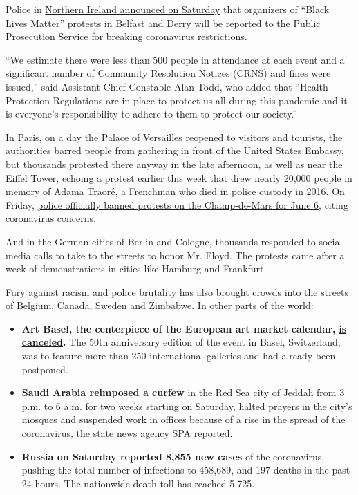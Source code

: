 Police in
\href{https://www.psni.police.uk/news/Latest-News/060620-planned-protests-in-belfast-and-derrylondonderry-have-ended/}{Northern
Ireland announced on Saturday} that organizers of ``Black Lives Matter''
protests in Belfast and Derry will be reported to the Public Prosecution
Service for breaking coronavirus restrictions.

``We estimate there were less than 500 people in attendance at each
event and a significant number of Community Resolution Notices (CRNS)
and fines were issued,'' said Assistant Chief Constable Alan Todd, who
added that ``Health Protection Regulations are in place to protect us
all during this pandemic and it is everyone's responsibility to adhere
to them to protect our society.''

In Paris,
\href{https://twitter.com/CVersailles/status/1269154953844703232}{on a
day the Palace of Versailles reopened} to visitors and tourists, the
authorities barred people from gathering in front of the United States
Embassy, but thousands protested there anyway in the late afternoon, as
well as near the Eiffel Tower, echoing a protest earlier this week that
drew nearly 20,000 people in memory of Adama Traoré, a Frenchman who
died in police custody in 2016. On Friday,
\href{https://twitter.com/prefpolice/status/1269002972807278595}{police
officially banned protests on the Champ-de-Mars for June 6}, citing
coronavirus concerns.

And in the German cities of Berlin and Cologne, thousands responded to
social media calls to take to the streets to honor Mr. Floyd. The
protests came after a week of demonstrations in cities like Hamburg and
Frankfurt.

Fury against racism and police brutality has also brought crowds into
the streets of Belgium, Canada, Sweden and Zimbabwe. In other parts of
the world:

\begin{itemize}
\tightlist
\item
  \textbf{Art Basel, the centerpiece of the European art market
  calendar,}
  \textbf{\href{https://www.nytimes3xbfgragh.onion/2020/06/06/arts/design/art-basel-cancels-fair-virus.html}{is
  canceled}.} The 50th anniversary edition of the event in Basel,
  Switzerland, was to feature more than 250 international galleries and
  had already been postponed.
\end{itemize}

\begin{itemize}
\item
  \textbf{Saudi Arabia reimposed a curfew} in the Red Sea city of Jeddah
  from 3 p.m. to 6 a.m. for two weeks starting on Saturday, halted
  prayers in the city's mosques and suspended work in offices because of
  a rise in the spread of the coronavirus, the state news agency SPA
  reported.
\item
  \textbf{Russia on Saturday reported 8,855 new cases} of the
  coronavirus, pushing the total number of infections to 458,689, and
  197 deaths in the past 24 hours. The nationwide death toll has reached
  5,725.
\end{itemize}

